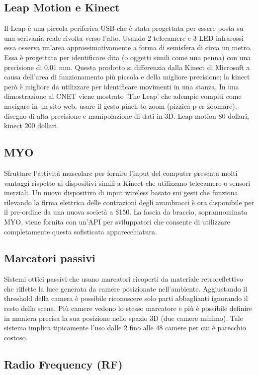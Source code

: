 \documentclass[8pt]{extarticle}
\begin{document}
\begin{multicols}{3}
\subsection{Leap Motion e Kinect}
Il Leap è una piccola periferica USB che è stata progettata per essere posta su una scrivania reale rivolta verso l'alto. Usando 2 telecamere e 3 LED infrarossi essa osserva un'area approssimativamente a forma di semisfera di circa un metro. Essa è progettata per identificare dita (o oggetti simili come una penna) con una precisione di 0,01 mm.
Questa prodotto si differenzia dalla Kinect di Microsoft a causa dell'area di funzionamento più piccola e della migliore precisione; la kinect però è migliore da utilizzare per identificare movimenti in una stanza. In una dimostrazione al CNET viene mostrato 'The Leap' che adempie compiti come navigare in un sito web, usare il gesto pinch-to-zoom (pizzica p
er zoomare), disegno di alta precisione e manipolazione di dati in 3D. 
Leap motion 80 dollari, kinect 200 dollari.
\subsection{MYO}
Sfruttare l'attività muscolare per fornire l'input del computer presenta molti vantaggi rispetto ai dispositivi simili a Kinect che utilizzano telecamere o sensori inerziali. Un nuovo dispositivo di input wireless basato sui gesti che funziona rilevando la firma elettrica delle contrazioni degli avambracci è ora disponibile per il pre-ordine da una nuova società a \$150. La fascia da braccio, soprannominata MYO, viene fornita con un'API per sviluppatori che consente di utilizzare completamente questa sofisticata apparecchiatura.
\subsection{Marcatori passivi}
Sistemi ottici passivi che usano marcatori ricoperti da materiale retroreflettivo che riflette la luce generata da camere posizionate nell'ambiente.
Aggiustando il threshold della camera è possibile riconoscere solo parti abbaglianti ignorando il resto della scena.
Più camere vedono lo stesso marcatore e più è possibile definire in maniera precisa la sua posizione nello spazio 3D (due camere minimo).
Tale sistema implica tipicamente l'uso dalle 2 fino alle 48 camere per cui è parecchio costoso.
\subsection{Radio Frequency (RF)}

\end{multicols}
\end{document}
